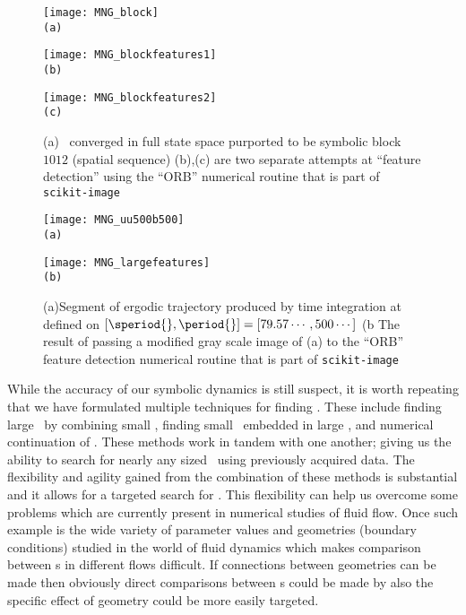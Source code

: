 \begin{figure}[t]
\begin{minipage}[height=.30\textheight]{.30\textwidth}
\centering
\texttt{[image: MNG\_block]}
\\ \small{\texttt{(a)}}
\end{minipage}
\begin{minipage}[height=.30\textheight]{.30\textwidth}
\centering
\texttt{[image: MNG\_blockfeatures1]}
\\ \small{\texttt{(b)}}
\end{minipage}
\begin{minipage}[height=.30\textheight]{.30\textwidth}
\centering
\texttt{[image: MNG\_blockfeatures2]}
\\ \small{\texttt{(c)}}
\end{minipage}
\caption{\label{f:MNGblockfeatures}
(a) \twoT\ converged in full state space purported to be
symbolic block $1012$ (spatial sequence)
(b),(c) are two separate attempts at ``feature detection'' using
the ``ORB'' numerical routine that is part of \texttt{scikit-image}
}
\end{figure}

\begin{figure}[t]
\begin{minipage}[height=.80\textheight]{.80\textwidth}
\centering
\texttt{[image: MNG\_uu500b500]}
\\ \small{\texttt{(a)}}
\end{minipage}
\begin{minipage}[height=.80\textheight]{.80\textwidth}
\centering
\texttt{[image: MNG\_largefeatures]}
\\ \small{\texttt{(b)}}
\end{minipage}
\caption{\label{f:MNGlargeLfeatures}
(a)Segment of ergodic trajectory produced by time integration
at defined on $[\speriod{},\period{}]=[79.57\cdots,500\cdots]$
(b The result of passing a modified gray scale image of (a) to
the ``ORB'' feature detection
numerical routine that is part of \texttt{scikit-image}
}
\end{figure}

While the accuracy of our symbolic dynamics is
still suspect, it is worth repeating that
we have formulated multiple techniques for
finding \twots. These include
finding large \twots\ by combining small \twots, finding
small \twots\ embedded in large \twots, and
numerical continuation of \twots. These methods work
in tandem with one another; giving
us the ability to search for nearly any sized \twot\ using
previously acquired data. The flexibility and agility
gained from the combination of these methods is substantial
and it allows for a targeted search for \twots.
This flexibility can help us overcome some problems which
are currently present in numerical studies of fluid flow.
Once such example is the wide variety of parameter values
and geometries (boundary conditions) studied
in the world of fluid dynamics which makes comparison
between {\po}s in different flows difficult. If connections
between geometries can be made then obviously direct comparisons
between {\po}s could be made by also the
specific effect of geometry could be more easily targeted.

